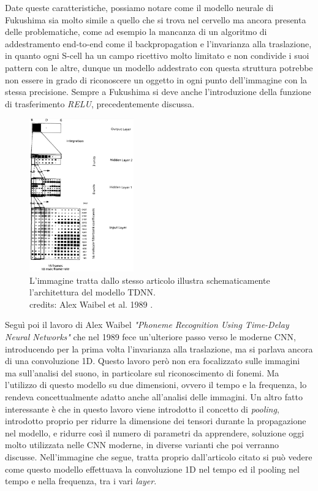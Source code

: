 Date queste caratteristiche, possiamo notare come il modello neurale di Fukushima sia molto simile a quello che si trova nel cervello
ma ancora presenta delle problematiche, come ad esempio la mancanza di un algoritmo di addestramento end-to-end come il backpropagation e 
l'invarianza alla traslazione, in quanto ogni S-cell ha un campo ricettivo molto limitato e non condivide i suoi pattern con le altre,
dunque un modello addestrato con questa struttura potrebbe non essere in grado di riconoscere un oggetto in ogni punto dell'immagine con la stessa precisione.
Sempre a Fukushima si deve anche l'introduzione della funzione di trasferimento \textit{RELU}, precedentemente discussa.

\begin{figure}
    \centering
    \includegraphics[width=0.4\textwidth]{imgs/tdnn_architecture_1.png}
    \caption{L'immagine tratta dallo stesso articolo illustra schematicamente l'architettura del modello TDNN.\\
    credits: Alex Waibel et al. 1989 \cite{Waibel1989PhonemeRecognition}.}
    \label{fig:waibel_network_1}
\end{figure}

Seguì poi il lavoro di Alex Waibel \textit{"Phoneme Recognition Using Time-Delay Neural Networks"} \cite{Waibel1989PhonemeRecognition} 
che nel 1989 fece un'ulteriore passo verso le moderne CNN, introducendo per la prima volta l'invarianza alla traslazione, 
ma si parlava ancora di una convoluzione 1D. 
Questo lavoro però non era focalizzato sulle immagini ma sull'analisi del suono, in particolare sul riconoscimento di fonemi.
Ma l'utilizzo di questo modello su due dimensioni, ovvero il tempo e la frequenza, lo rendeva concettualmente adatto 
anche all'analisi delle immagini. Un altro fatto interessante è che in questo lavoro viene introdotto il concetto di \textit{pooling},
introdotto proprio per ridurre la dimensione dei tensori durante la propagazione nel modello, e ridurre così il numero di parametri da apprendere,
soluzione oggi molto utilizzata nelle CNN moderne, in diverse varianti che poi verranno discusse.
Nell'immagine che segue, tratta proprio dall'articolo citato si può vedere come questo modello effettuava la convoluzione 1D nel tempo ed il pooling
nel tempo e nella frequenza, tra i vari \textit{layer}.

